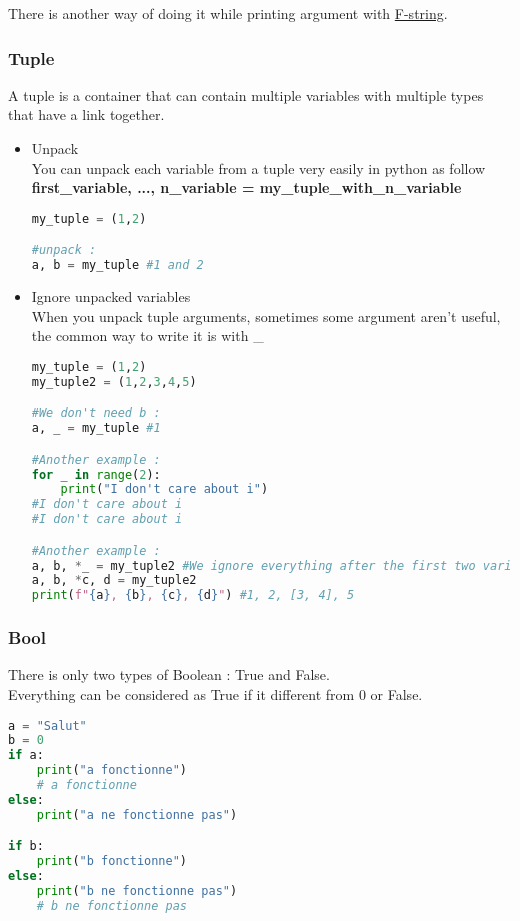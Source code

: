 \documentclass[a4paper, 12pt, titlepage]{scrartcl} %
\begin{document}
There is another way of doing it while printing argument with \hyperref[subsec:F-string]{F-string}.

\subsubsection{Tuple}
A tuple is a container that can contain multiple variables with multiple types that have a link together. \\
\begin{itemize}
\item Unpack \\
You can unpack each variable from a tuple very easily in python as follow \textbf{first\_variable, ..., n\_variable = my\_tuple\_with\_n\_variable}
\begin{lstlisting}[language=Python]
my_tuple = (1,2)

#unpack :
a, b = my_tuple #1 and 2
\end{lstlisting} \vspace{5mm}

\item Ignore unpacked variables \\
When you unpack tuple arguments, sometimes some argument aren't useful, the common way to write it is with \_
\begin{lstlisting}[language=Python]
my_tuple = (1,2)
my_tuple2 = (1,2,3,4,5)

#We don't need b :
a, _ = my_tuple #1

#Another example :
for _ in range(2):
	print("I don't care about i")
#I don't care about i
#I don't care about i

#Another example :
a, b, *_ = my_tuple2 #We ignore everything after the first two variables, the rest is stored in a list.
a, b, *c, d = my_tuple2 
print(f"{a}, {b}, {c}, {d}") #1, 2, [3, 4], 5
\end{lstlisting} \vspace{5mm}
\end{itemize}


\subsubsection{Bool}
\label{subsec:Bool}
There is only two types of Boolean : True and False. \\
Everything can be considered as True if it different from 0 or False. \\
\begin{lstlisting}[language=Python]
a = "Salut"
b = 0
if a:
	print("a fonctionne")
	# a fonctionne
else:
	print("a ne fonctionne pas")

if b:
	print("b fonctionne")
else:
	print("b ne fonctionne pas")
	# b ne fonctionne pas
\end{lstlisting} \vspace{5mm}
\end{document}
